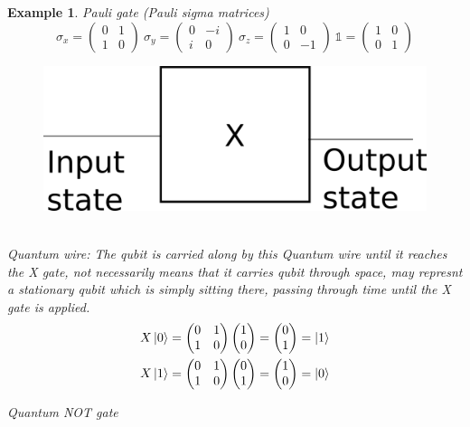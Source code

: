 \documentclass[]{article}
\newtheorem*{example}{Example}
\theoremstyle{nonumberplain}
\begin{document}
\begin{example}
	Pauli gate (Pauli sigma matrices) \\
\[
\sigma_{x}=
\begin{pmatrix}
	0 & 1\\
	1 & 0
\end{pmatrix}
\ \sigma_{y}=
\begin{pmatrix}
	0 & -i\\
	i & 0
\end{pmatrix}
\ \sigma_{z}=
\begin{pmatrix}
	1 & 0\\
	0 & -1 
\end{pmatrix}
\ \mathds{1}=
\begin{pmatrix}
	1 & 0\\
	0 & 1 
\end{pmatrix}
\] 
\begin{figure}[!hbt]
	\centering
	\includegraphics[scale=0.5]{1.png}
\end{figure}
\\
Quantum wire: The qubit is carried along by this Quantum wire until it reaches the X gate, not necessarily means that it carries qubit through space, may represnt a stationary qubit which is simply sitting there, passing through time until the X gate is applied.
\begin{equation*}
\begin{aligned}
	X\ket{0} &= 
\begin{pmatrix}
	0 & 1 \\
	1 & 0 
\end{pmatrix}
\begin{pmatrix}
1 \\
0
\end{pmatrix}
=
\begin{pmatrix}
0 \\
1
\end{pmatrix}
=\ket{1} 
\\
X\ket{1} &= 
\begin{pmatrix}
	0 & 1 \\
	1 & 0 
\end{pmatrix}
\begin{pmatrix}
0 \\
1
\end{pmatrix}
=
\begin{pmatrix}
1 \\
0
\end{pmatrix}
= \ket{0}
\end{aligned}
\end{equation*}
\begin{center}
Quantum NOT gate
\end{center}
\end{example}
\end{document}
